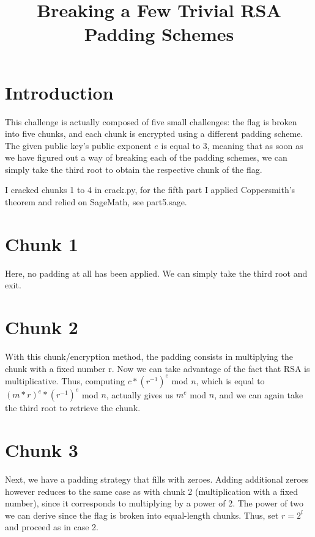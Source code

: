 \documentclass{article}
\title{Breaking a Few Trivial RSA Padding Schemes}
\begin{document}
\maketitle

\section{Introduction}

This challenge is actually composed of five small challenges: the flag is broken into five chunks, and each chunk is encrypted using a different padding scheme. The given public key's public exponent $e$ is equal to 3, meaning that as soon as we have figured out a way of breaking each of the padding schemes, we can simply take the third root to obtain the respective chunk of the flag.

\medskip

I cracked chunks 1 to 4 in crack.py, for the fifth part I applied Coppersmith's theorem and relied on SageMath, see part5.sage.

\section{Chunk 1}

Here, no padding at all has been applied. We can simply take the third root and exit.

\section{Chunk 2}

With this chunk/encryption method, the padding consists in multiplying the chunk with a fixed number r. Now we can take advantage of the fact that RSA is multiplicative. Thus, computing $c*(r^{-1})^e$ mod $n$, which is equal to $(m*r)^e*(r^{-1})^e$ mod $n$, actually gives us $m^e$ mod $n$, and we can again take the third root to retrieve the chunk.

\section{Chunk 3}

Next, we have a padding strategy that fills with zeroes. Adding additional zeroes however reduces to the same case as with chunk 2 (multiplication with a fixed number), since it corresponds to multiplying by a power of 2. The power of two we can derive since the flag is broken into equal-length chunks. Thus, set $r=2^{l}$ and  proceed as in case 2.
\end{document}
